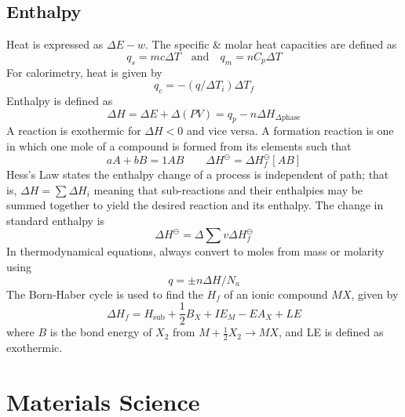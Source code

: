 \documentclass{tufte-book}
\begin{document}
\section{Enthalpy}
Heat is expressed as $\Delta E - w$. The specific \& molar heat capacities are defined as \begin{equation}
  q_s = mc \Delta T \quad\text{and}\quad q_m = nC_p \Delta T
\end{equation}
For calorimetry, heat is given by \begin{equation}
  q_c = -(q / \Delta T_i) \Delta T_f
\end{equation}
Enthalpy is defined as \begin{equation}
  \Delta H = \Delta E + \Delta (PV) = q_p - n \Delta H_{\Delta \text{phase}}
\end{equation}
A reaction is exothermic for $\Delta H<0$ and vice versa. A formation reaction is one in which one mole of a compound is formed from its elements such that \begin{equation}
  aA + bB = 1AB \qquad \Delta H^\ominus = \Delta H_f^\ominus [AB]
\end{equation}
Hess's Law states the enthalpy change of a process is independent of path; that is, $\Delta H = \sum \Delta H_i$ meaning that sub-reactions and their enthalpies may be summed together to yield the desired reaction and its enthalpy. The change in standard enthalpy is \begin{equation}
  \Delta H^\ominus = \Delta \sum v \Delta H_f^\ominus
\end{equation}
In thermodynamical equations, always convert to moles from mass or molarity using \begin{equation}
  q = \pm n \Delta H / N_a
\end{equation}
The Born-Haber cycle is used to find the $H_f$ of an ionic compound $MX$, given by \begin{equation}
  \Delta H_f = H_{\text{sub}} + \textstyle{\frac{1}{2}} B_X + IE_M - EA_X + LE
\end{equation}
where $B$ is the bond energy of $X_2$ from $M + \frac{1}{2} X_2 \to MX$, and LE is defined as exothermic.

\chapter{Materials Science}
\end{document}
